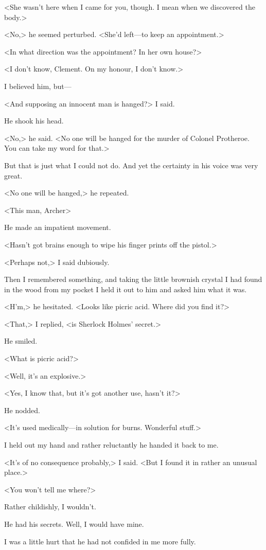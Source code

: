 <She wasn't here when I came for you, though. I mean when we discovered the body.>

<No,> he seemed perturbed. <She'd left—to keep an appointment.>

<In what direction was the appointment? In her own house?>

<I don't know, Clement. On my honour, I don't know.>

I believed him, but—

<And supposing an innocent man is hanged?> I said.

He shook his head.

<No,> he said. <No one will be hanged for the murder of Colonel Protheroe. You can take my word for that.>

But that is just what I could not do. And yet the certainty in his voice was very great.

<No one will be hanged,> he repeated.

<This man, Archer\longdash>

He made an impatient movement.

<Hasn't got brains enough to wipe his finger prints off the pistol.>

<Perhaps not,> I said dubiously.

Then I remembered something, and taking the little brownish crystal I had found in the wood from my pocket I held it out to him and asked him what it was.

<H'm,> he hesitated. <Looks like picric acid. Where did you find it?>

<That,> I replied, <is Sherlock Holmes' secret.>

He smiled.

<What is picric acid?>

<Well, it's an explosive.>

<Yes, I know that, but it's got another use, hasn't it?>

He nodded.

<It's used medically—in solution for burns. Wonderful stuff.>

I held out my hand and rather reluctantly he handed it back to me.

<It's of no consequence probably,> I said. <But I found it in rather an unusual place.>

<You won't tell me where?>

Rather childishly, I wouldn't.

He had his secrets. Well, I would have mine.

I was a little hurt that he had not confided in me more fully.